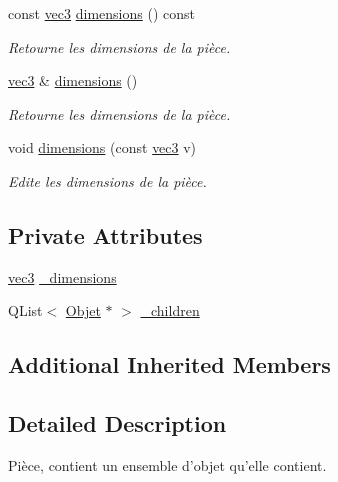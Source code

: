 \begin{DoxyCompactItemize}
const \hyperlink{structvec3}{vec3} \hyperlink{class_piece_ab522c715b4dd27b0789f5aed218ab59d}{dimensions} () const 
\begin{DoxyCompactList}\small\item\em Retourne les dimensions de la pièce. \end{DoxyCompactList}\item 
\hyperlink{structvec3}{vec3} \& \hyperlink{class_piece_a3f5440ec22866d79a26a513470744412}{dimensions} ()
\begin{DoxyCompactList}\small\item\em Retourne les dimensions de la pièce. \end{DoxyCompactList}\item 
void \hyperlink{class_piece_a4419c3b0a9e57dcd215dd87be025752f}{dimensions} (const \hyperlink{structvec3}{vec3} v)
\begin{DoxyCompactList}\small\item\em Edite les dimensions de la pièce. \end{DoxyCompactList}\end{DoxyCompactItemize}
\subsection*{Private Attributes}
\begin{DoxyCompactItemize}
\item 
\hyperlink{structvec3}{vec3} \hyperlink{class_piece_a47a3458694b894041bd95a1666c9bf3d}{\+\_\+dimensions}
\item 
Q\+List$<$ \hyperlink{class_objet}{Objet} $\ast$ $>$ \hyperlink{class_piece_a3ba9c0e4bdea96982145e7ae693f5c2a}{\+\_\+children}
\end{DoxyCompactItemize}
\subsection*{Additional Inherited Members}


\subsection{Detailed Description}
Pièce, contient un ensemble d'objet qu'elle contient. 

